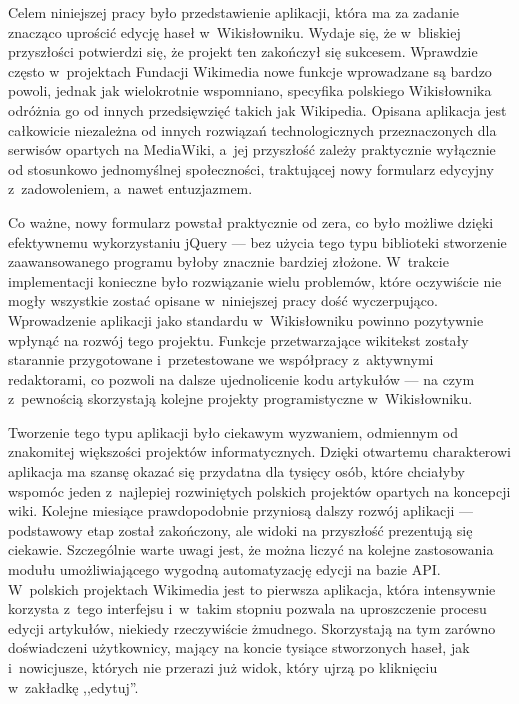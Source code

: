 Celem niniejszej pracy było przedstawienie aplikacji, która ma za zadanie znacząco uprościć edycję haseł w~Wikisłowniku. Wydaje się, że w~bliskiej przyszłości potwierdzi się, że projekt ten zakończył się sukcesem. Wprawdzie często w~projektach Fundacji Wikimedia nowe funkcje wprowadzane są bardzo powoli, jednak jak wielokrotnie wspomniano, specyfika  polskiego Wikisłownika odróżnia go od innych przedsięwzięć takich jak Wikipedia. Opisana aplikacja jest całkowicie niezależna od innych rozwiązań technologicznych przeznaczonych dla serwisów opartych na MediaWiki, a~jej przyszłość zależy praktycznie wyłącznie od stosunkowo jednomyślnej społeczności, traktującej nowy formularz edycyjny z~zadowoleniem, a~nawet entuzjazmem.

Co ważne, nowy formularz powstał praktycznie od zera, co było możliwe dzięki efektywnemu wykorzystaniu jQuery --- bez użycia tego typu biblioteki stworzenie zaawansowanego programu byłoby znacznie bardziej złożone. W~trakcie implementacji konieczne było rozwiązanie wielu problemów, które oczywiście nie mogły wszystkie zostać opisane w~niniejszej pracy dość wyczerpująco. Wprowadzenie aplikacji jako standardu w~Wikisłowniku powinno pozytywnie wpłynąć na rozwój tego projektu. Funkcje przetwarzające wikitekst zostały starannie przygotowane i~przetestowane we współpracy z~aktywnymi redaktorami, co pozwoli na dalsze ujednolicenie kodu artykułów --- na czym z~pewnością skorzystają kolejne projekty programistyczne w~Wikisłowniku.

Tworzenie tego typu aplikacji było ciekawym wyzwaniem, odmiennym od znakomitej większości projektów informatycznych. Dzięki otwartemu charakterowi aplikacja ma szansę okazać się przydatna dla tysięcy osób, które chciałyby wspomóc jeden z~najlepiej rozwiniętych polskich projektów opartych na koncepcji wiki. Kolejne miesiące prawdopodobnie przyniosą dalszy rozwój aplikacji --- podstawowy etap został zakończony, ale widoki na przyszłość prezentują się ciekawie. Szczególnie warte uwagi jest, że można liczyć na kolejne zastosowania modułu umożliwiającego wygodną automatyzację edycji na bazie API. W~polskich projektach Wikimedia jest to pierwsza aplikacja, która intensywnie korzysta z~tego interfejsu i~w~takim stopniu pozwala na uproszczenie procesu edycji artykułów, niekiedy rzeczywiście żmudnego. Skorzystają na tym zarówno doświadczeni użytkownicy, mający na koncie tysiące stworzonych haseł, jak i~nowicjusze, których nie przerazi już widok, który ujrzą po kliknięciu w~zakładkę ,,edytuj''.
